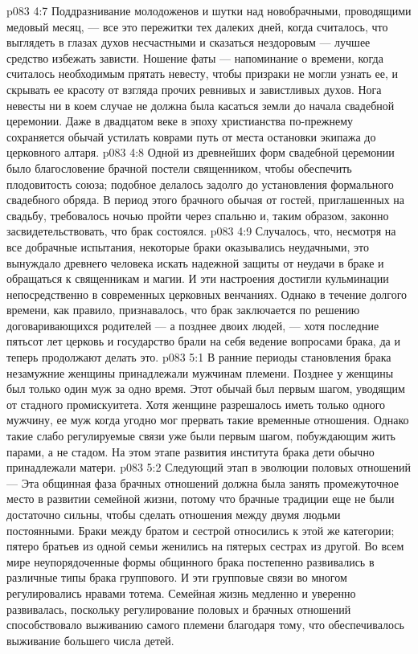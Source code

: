 \vs p083 4:7 Поддразнивание молодоженов и шутки над новобрачными, проводящими медовый месяц, --- все это пережитки тех далеких дней, когда считалось, что выглядеть в глазах духов несчастными и сказаться нездоровым --- лучшее средство избежать зависти. Ношение фаты --- напоминание о времени, когда считалось необходимым прятать невесту, чтобы призраки не могли узнать ее, и скрывать ее красоту от взгляда прочих ревнивых и завистливых духов. Нога невесты ни в коем случае не должна была касаться земли до начала свадебной церемонии. Даже в двадцатом веке в эпоху христианства по\hyp{}прежнему сохраняется обычай устилать коврами путь от места остановки экипажа до церковного алтаря.
\vs p083 4:8 Одной из древнейших форм свадебной церемонии было благословение брачной постели священником, чтобы обеспечить плодовитость союза; подобное делалось задолго до установления формального свадебного обряда. В период этого брачного обычая от гостей, приглашенных на свадьбу, требовалось ночью пройти через спальню и, таким образом, законно засвидетельствовать, что брак состоялся.
\vs p083 4:9 Случалось, что, несмотря на все добрачные испытания, некоторые браки оказывались неудачными, это вынуждало древнего человека искать надежной защиты от неудачи в браке и обращаться к священникам и магии. И эти настроения достигли кульминации непосредственно в современных церковных венчаниях. Однако в течение долгого времени, как правило, признавалось, что брак заключается по решению договаривающихся родителей --- а позднее двоих людей, --- хотя последние пятьсот лет церковь и государство брали на себя ведение вопросами брака, да и теперь продолжают делать это.
\vs p083 5:1 В ранние периоды становления брака незамужние женщины принадлежали мужчинам племени. Позднее у женщины был только один муж за одно время. Этот обычай  был первым шагом, уводящим от стадного промискуитета. Хотя женщине разрешалось иметь только одного мужчину, ее муж когда угодно мог прервать такие временные отношения. Однако такие слабо регулируемые связи уже были первым шагом, побуждающим жить парами, а не стадом. На этом этапе развития института брака дети обычно принадлежали матери.
\vs p083 5:2 Следующий этап в эволюции половых отношений ---  Эта общинная фаза брачных отношений должна была занять промежуточное место в развитии семейной жизни, потому что брачные традиции еще не были достаточно сильны, чтобы сделать отношения между двумя людьми постоянными. Браки между братом и сестрой относились к этой же категории; пятеро братьев из одной семьи женились на пятерых сестрах из другой. Во всем мире неупорядоченные формы общинного брака постепенно развивались в различные типы брака группового. И эти групповые связи во многом регулировались нравами тотема. Семейная жизнь медленно и уверенно развивалась, поскольку регулирование половых и брачных отношений способствовало выживанию самого племени благодаря тому, что обеспечивалось выживание большего числа детей.
